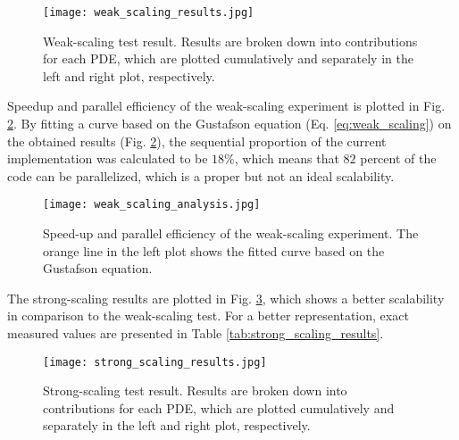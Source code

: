 \begin{figure}[h]
\centering
\medskip
\texttt{[image: weak\_scaling\_results.jpg]}
\caption[Weak-scaling test result]{Weak-scaling test result. Results are broken down into contributions for each \gls{PDE}, which are plotted  cumulatively and separately in the left and right plot, respectively.} \label{fig:weak_scaling_results}
\end{figure}

Speedup and parallel efficiency of the weak-scaling experiment is plotted in Fig. \ref{fig:weak_scaling_analysis}.  By fitting a curve based on the Gustafson equation (Eq. \ref{eq:weak_scaling}) on the obtained results (Fig. \ref{fig:weak_scaling_analysis}), the sequential proportion of the current implementation was calculated to be $18\%$, which means that  $82$ percent of the code can be parallelized, which is a proper but not an ideal scalability.

\begin{figure}[h]
\centering
\medskip
\texttt{[image: weak\_scaling\_analysis.jpg]}
\caption[Speed-up and parallel efficiency of the weak-scaling experiment]{Speed-up and parallel efficiency of the weak-scaling experiment. The orange line in the left plot shows the fitted curve based on the Gustafson equation.} \label{fig:weak_scaling_analysis}
\end{figure}

The strong-scaling results are plotted in Fig. \ref{fig:strong_scaling_results}, which shows a better scalability in comparison to the weak-scaling test. For a better representation, exact measured values are presented in Table \ref{tab:strong_scaling_results}.


\begin{figure}[h]
\centering
\medskip
\texttt{[image: strong\_scaling\_results.jpg]}
\caption[Strong-scaling test result]{Strong-scaling test result. Results are broken down into contributions  for each \gls{PDE}, which are plotted  cumulatively and separately in the left and right plot, respectively.} \label{fig:strong_scaling_results}
\end{figure}

